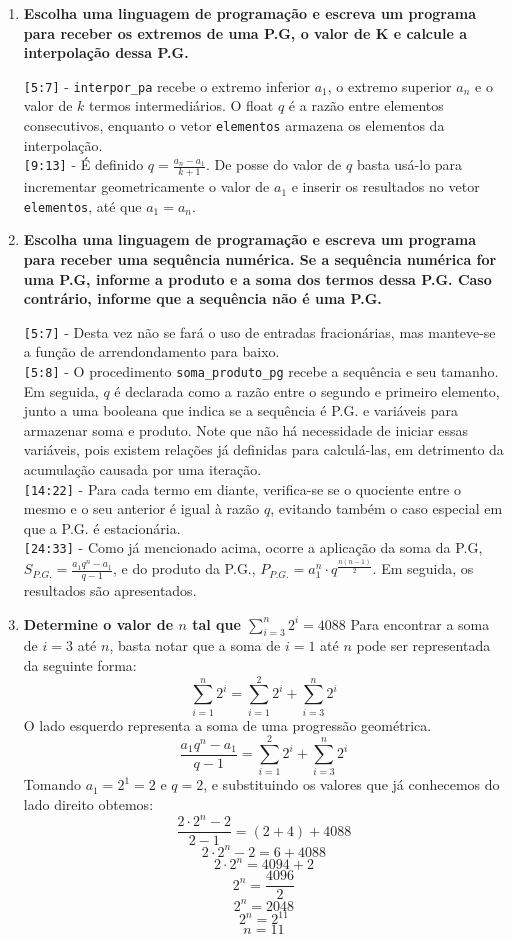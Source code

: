 \begin{enumerate}
	\item \textbf{Escolha uma linguagem de programação e escreva um programa para receber os extremos de uma P.G, o valor de K e calcule a interpolação dessa P.G.}
	
	\verb|[5:7]| - \verb|interpor_pa| recebe o extremo inferior $a_1$, o extremo superior $a_ n$ e o valor de $k$ termos intermediários. O float $q$ é a razão entre elementos consecutivos, enquanto o vetor \verb|elementos| armazena os elementos da interpolação.\\
	\verb|[9:13]| - É definido $q = \frac{a_n - a_1}{k+1}$. De posse do valor de $q$ basta usá-lo para incrementar geometricamente o valor de $a_1$ e inserir os resultados no vetor \verb|elementos|, até que $a_1 = a_n$.
	
	\pagebreak
	\item \textbf{Escolha uma linguagem de programação e escreva um programa para receber uma sequência numérica. Se a sequência numérica for uma P.G, informe a produto e a soma dos termos dessa P.G. Caso contrário, informe que a sequência não é uma P.G.}
	
	\verb|[5:7]| - Desta vez não se fará o uso de entradas fracionárias, mas manteve-se a função de arrendondamento para baixo.\\
	\verb|[5:8]| - O procedimento \verb|soma_produto_pg| recebe a sequência e seu tamanho. Em seguida, $q$ é declarada como a razão entre o segundo e primeiro elemento, junto a uma booleana que indica se a sequência é P.G. e variáveis para armazenar soma e produto. Note que não há necessidade de iniciar essas variáveis, pois existem relações já definidas para calculá-las, em detrimento da acumulação causada por uma iteração.\\
	\verb|[14:22]| - Para cada termo em diante, verifica-se se o quociente entre o mesmo e o seu anterior é igual à razão $q$, evitando também o caso especial em que a P.G. é estacionária.\\
	\verb|[24:33]| - Como já mencionado acima, ocorre a aplicação da soma da P.G, $S_{P.G.} = \frac{a_1q^n-a_ 1}{q-1}$, e do produto da P.G., $P_{P.G.} = a_1^n\cdot q^{\frac{n(n-1)}{2}}$. Em seguida, os resultados são apresentados.

	\item \textbf{Determine o valor de $n$ tal que $\sum_{i=3}^n 2^i = 4088$}
	Para encontrar a soma de $i=3$ até $n$, basta notar que a soma de $i=1$ até $n$ pode ser representada da seguinte forma:
	$$\sum_{i=1}^{n} 2^i = \sum_{i=1}^{2} 2^i + \sum_{i=3}^{n} 2^i$$
	O lado esquerdo representa a soma de uma progressão geométrica.
	$$\frac{a_1q^n-a_1}{q-1} = \sum_{i=1}^{2} 2^i + \sum_{i=3}^{n} 2^i$$
	Tomando $a_1 = 2^1 = 2$ e $q = 2$, e substituindo os valores que já conhecemos do lado direito obtemos:
	$$\frac{2\cdot 2^n-2}{2-1} = (2+4) + 4088$$
	$$2\cdot 2^n-2 = 6 + 4088$$
	$$2\cdot2^n = 4094+2$$
	$$2^n = \frac{4096}{2}$$
	$$2^n = 2048$$
	$$2^n = 2^{11}$$
	$$n = 11$$
	
\end{enumerate}